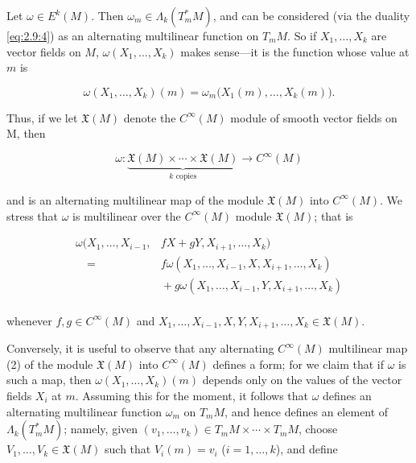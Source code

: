 \label{thm:2.18}
Let  $ \omega \in E^k(M) $. Then  $ \omega_m \in \Lambda_k(T_{m}^{*} M) $, and can be considered (via the duality \eqref{eq:2.9:4}) as an alternating multilinear function on  $ T_{m} M $. So if  $ X_1, \ldots, X_k $ are vector fields on  $ M $,  $ \omega(X_1, \ldots, X_k) $ makes sense—it is the function whose value at  $ m $ is

\begin{equation}
\tag{1}\label{eq:2.18:1}
\omega(X_{1},\ldots,X_{k})(m)=\omega_{m}\bigl(X_{1}(m),\ldots,X_{k}(m)\bigr).
\end{equation}

Thus, if we let  $ \mathfrak{X}(M) $ denote the  $ C^\infty(M) $ module of smooth vector fields on M, then

\begin{equation}
\tag{2}\label{eq:2.18:2}
\omega\colon\underbrace{\mathfrak{X}(M)\times\cdots\times\mathfrak{X}(M)}_{k\text{ copies}}\to C^{\infty}(M)
\end{equation}

and is an alternating multilinear map of the module  $ \mathfrak{X}(M) $ into  $ C^\infty(M) $. We stress that  $ \omega $ is multilinear over the  $ C^\infty(M) $ module  $ \mathfrak{X}(M) $; that is

\begin{equation}
\tag{3}\label{eq:2.18:3}
\begin{aligned}{\omega(X_{1},\ldots,X_{i-1},}&{{}f X+g Y,X_{i+1},\ldots,X_{k})}\\ {\quad=}&{{}f\omega(X_{1},\ldots,X_{i-1},X,X_{i+1},\ldots,X_{k})}\\ {}&{{}+g\omega(X_{1},\ldots,X_{i-1},Y,X_{i+1},\ldots,X_{k})}\\ \end{aligned}
\end{equation}

whenever $f, g \in C^\infty(M)$ and $X_1, \ldots, X_{i-1}, X, Y, X_{i+1}, \ldots, X_k \in \mathfrak{X}(M)$.

Conversely, it is useful to observe that any alternating $C^\infty(M)$ multilinear map (2) of the module $\mathfrak{X}(M)$ into $C^\infty(M)$ defines a form; for we claim that if $\omega$ is such a map, then $\omega(X_1, \ldots, X_k)(m)$ depends only on the values of the vector fields $X_i$ at $m$. Assuming this for the moment, it follows that $\omega$ defines an alternating multilinear function $\omega_m$ on $T_{m} M$, and hence defines an element of $\Lambda_k(T_{m}^{*} M)$; namely, given $(v_1, \ldots, v_k) \in T_{m} M \times \cdots \times T_{m} M$, choose $V_1, \ldots, V_k \in \mathfrak{X}(M)$ such that $V_i(m) = v_i$ ($i = 1, \ldots, k$), and define

